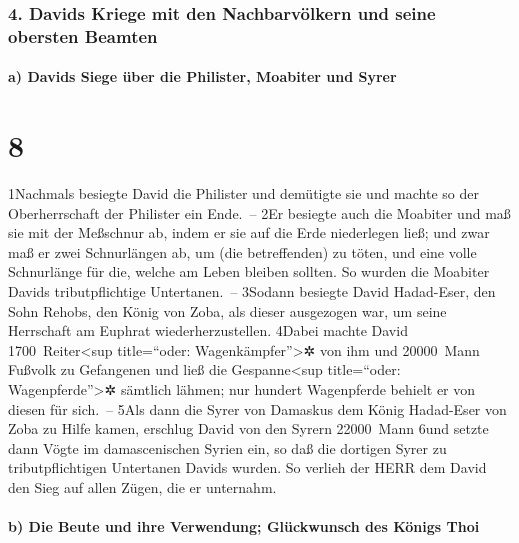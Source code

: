 \hypertarget{davids-kriege-mit-den-nachbarvuxf6lkern-und-seine-obersten-beamten}{%
\subsubsection{4. Davids Kriege mit den Nachbarvölkern und seine
obersten
Beamten}\label{davids-kriege-mit-den-nachbarvuxf6lkern-und-seine-obersten-beamten}}

\hypertarget{a-davids-siege-uxfcber-die-philister-moabiter-und-syrer}{%
\paragraph{a) Davids Siege über die Philister, Moabiter und
Syrer}\label{a-davids-siege-uxfcber-die-philister-moabiter-und-syrer}}

\hypertarget{section-7}{%
\section{8}\label{section-7}}

1Nachmals besiegte David die Philister und demütigte sie und machte so
der Oberherrschaft der Philister ein Ende.~-- 2Er besiegte auch die
Moabiter und maß sie mit der Meßschnur ab, indem er sie auf die Erde
niederlegen ließ; und zwar maß er zwei Schnurlängen ab, um (die
betreffenden) zu töten, und eine volle Schnurlänge für die, welche am
Leben bleiben sollten. So wurden die Moabiter Davids tributpflichtige
Untertanen.~-- 3Sodann besiegte David Hadad-Eser, den Sohn Rehobs, den
König von Zoba, als dieser ausgezogen war, um seine Herrschaft am
Euphrat wiederherzustellen. 4Dabei machte David 1700~Reiter\textless sup
title=``oder: Wagenkämpfer''\textgreater✲ von ihm und 20000~Mann Fußvolk
zu Gefangenen und ließ die Gespanne\textless sup title=``oder:
Wagenpferde''\textgreater✲ sämtlich lähmen; nur hundert Wagenpferde
behielt er von diesen für sich.~-- 5Als dann die Syrer von Damaskus dem
König Hadad-Eser von Zoba zu Hilfe kamen, erschlug David von den Syrern
22000~Mann 6und setzte dann Vögte im damascenischen Syrien ein, so daß
die dortigen Syrer zu tributpflichtigen Untertanen Davids wurden. So
verlieh der HERR dem David den Sieg auf allen Zügen, die er unternahm.

\hypertarget{b-die-beute-und-ihre-verwendung-gluxfcckwunsch-des-kuxf6nigs-thoi}{%
\paragraph{b) Die Beute und ihre Verwendung; Glückwunsch des Königs
Thoi}\label{b-die-beute-und-ihre-verwendung-gluxfcckwunsch-des-kuxf6nigs-thoi}}


